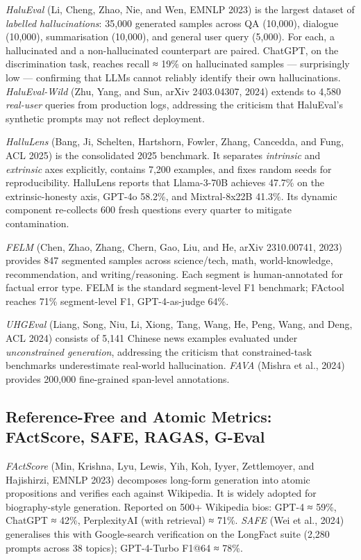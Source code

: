 \emph{HaluEval} (Li, Cheng, Zhao, Nie, and Wen, EMNLP 2023) is the largest dataset of \emph{labelled hallucinations}: 35,000 generated samples across QA (10,000), dialogue (10,000), summarisation (10,000), and general user query (5,000). For each, a hallucinated and a non-hallucinated counterpart are paired. ChatGPT, on the discrimination task, reaches recall ≈ 19\% on hallucinated samples --- surprisingly low --- confirming that LLMs cannot reliably identify their own hallucinations. \emph{HaluEval-Wild} (Zhu, Yang, and Sun, arXiv 2403.04307, 2024) extends to 4,580 \emph{real-user} queries from production logs, addressing the criticism that HaluEval's synthetic prompts may not reflect deployment.

\emph{HalluLens} (Bang, Ji, Schelten, Hartshorn, Fowler, Zhang, Cancedda, and Fung, ACL 2025) is the consolidated 2025 benchmark. It separates \emph{intrinsic} and \emph{extrinsic} axes explicitly, contains 7,200 examples, and fixes random seeds for reproducibility. HalluLens reports that Llama-3-70B achieves 47.7\% on the extrinsic-honesty axis, GPT-4o 58.2\%, and Mixtral-8x22B 41.3\%. Its dynamic component re-collects 600 fresh questions every quarter to mitigate contamination.

\emph{FELM} (Chen, Zhao, Zhang, Chern, Gao, Liu, and He, arXiv 2310.00741, 2023) provides 847 segmented samples across science/tech, math, world-knowledge, recommendation, and writing/reasoning. Each segment is human-annotated for factual error type. FELM is the standard segment-level F1 benchmark; FActool reaches 71\% segment-level F1, GPT-4-as-judge 64\%.

\emph{UHGEval} (Liang, Song, Niu, Li, Xiong, Tang, Wang, He, Peng, Wang, and Deng, ACL 2024) consists of 5,141 Chinese news examples evaluated under \emph{unconstrained generation}, addressing the criticism that constrained-task benchmarks underestimate real-world hallucination. \emph{FAVA} (Mishra et al., 2024) provides 200,000 fine-grained span-level annotations.

\subsection{Reference-Free and Atomic Metrics: FActScore, SAFE, RAGAS, G-Eval}\label{reference-free-and-atomic-metrics-factscore-safe-ragas-g-eval}

\emph{FActScore} (Min, Krishna, Lyu, Lewis, Yih, Koh, Iyyer, Zettlemoyer, and Hajishirzi, EMNLP 2023) decomposes long-form generation into atomic propositions and verifies each against Wikipedia. It is widely adopted for biography-style generation. Reported on 500+ Wikipedia bios: GPT-4 ≈ 59\%, ChatGPT ≈ 42\%, PerplexityAI (with retrieval) ≈ 71\%. \emph{SAFE} (Wei et al., 2024) generalises this with Google-search verification on the LongFact suite (2,280 prompts across 38 topics); GPT-4-Turbo F1@64 ≈ 78\%.

